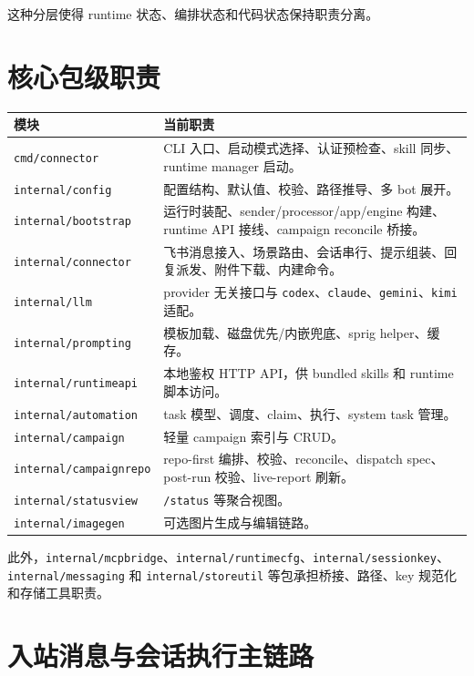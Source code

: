 \documentclass[12pt,a4paper]{ctexart}
\begin{document}
这种分层使得 runtime 状态、编排状态和代码状态保持职责分离。

\section{核心包级职责}

\begin{longtable}{p{} p{}}
\toprule
模块 & 当前职责 \\
\midrule
\endhead
\texttt{cmd/connector} & CLI 入口、启动模式选择、认证预检查、skill 同步、runtime manager 启动。 \\
\texttt{internal/config} & 配置结构、默认值、校验、路径推导、多 bot 展开。 \\
\texttt{internal/bootstrap} & 运行时装配、sender/processor/app/engine 构建、runtime API 接线、campaign reconcile 桥接。 \\
\texttt{internal/connector} & 飞书消息接入、场景路由、会话串行、提示组装、回复派发、附件下载、内建命令。 \\
\texttt{internal/llm} & provider 无关接口与 \texttt{codex}、\texttt{claude}、\texttt{gemini}、\texttt{kimi} 适配。 \\
\texttt{internal/prompting} & 模板加载、磁盘优先/内嵌兜底、sprig helper、缓存。 \\
\texttt{internal/runtimeapi} & 本地鉴权 HTTP API，供 bundled skills 和 runtime 脚本访问。 \\
\texttt{internal/automation} & task 模型、调度、claim、执行、system task 管理。 \\
\texttt{internal/campaign} & 轻量 campaign 索引与 CRUD。 \\
\texttt{internal/campaignrepo} & repo-first 编排、校验、reconcile、dispatch spec、post-run 校验、live-report 刷新。 \\
\texttt{internal/statusview} & \texttt{/status} 等聚合视图。 \\
\texttt{internal/imagegen} & 可选图片生成与编辑链路。 \\
\bottomrule
\end{longtable}

此外，\texttt{internal/mcpbridge}、\texttt{internal/runtimecfg}、\texttt{internal/sessionkey}、\texttt{internal/messaging} 和 \texttt{internal/storeutil} 等包承担桥接、路径、key 规范化和存储工具职责。

\section{入站消息与会话执行主链路}
\end{document}
